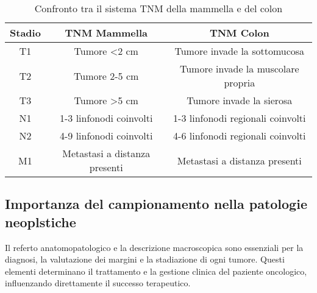 \begin{table}[h!]
    \centering
    \begin{tabular}{|c|c|c|}
        \hline
        \textbf{Stadio} & \textbf{TNM Mammella} & \textbf{TNM Colon} \\
        \hline
        T1 & Tumore \textless 2 cm & Tumore invade la sottomucosa \\
        \hline
        T2 & Tumore 2-5 cm & Tumore invade la muscolare propria \\
        \hline
        T3 & Tumore \textgreater 5 cm & Tumore invade la sierosa \\
        \hline
        N1 & 1-3 linfonodi coinvolti & 1-3 linfonodi regionali coinvolti \\
        \hline
        N2 & 4-9 linfonodi coinvolti & 4-6 linfonodi regionali coinvolti \\
        \hline
        M1 & Metastasi a distanza presenti & Metastasi a distanza presenti \\
        \hline
    \end{tabular}
    \caption{Confronto tra il sistema TNM della mammella e del colon}
    \label{tab:tnm_comparativo}
\end{table}

\subsection{Importanza del campionamento nella patologie neoplstiche}
Il referto anatomopatologico e la descrizione macroscopica sono essenziali per la diagnosi, la valutazione dei margini e la stadiazione di ogni tumore. Questi elementi determinano il trattamento e la gestione clinica del paziente oncologico, influenzando direttamente il successo terapeutico.

